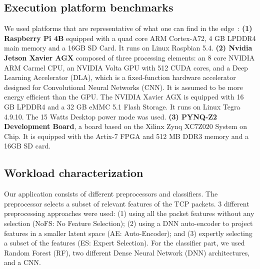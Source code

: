 \subsection{Execution platform benchmarks} \label{section:herocache-characterization-platforms}

We used platforms that are representative of what one can find in the edge~\cite{slimani:hal-04159551,kljucaric2020}: 
\textbf{(1) Raspberry Pi 4B} equipped with a quad core ARM Cortex-A72, 4 GB LPDDR4 main memory and a 16GB SD Card. It runs on Linux Raspbian 5.4.
\textbf{(2) Nvidia Jetson Xavier AGX} composed of three processing elements: an 8 core NVIDIA ARM Carmel CPU, an NVIDIA Volta GPU with 512 CUDA cores, and a Deep Learning Accelerator (DLA), which is a fixed-function hardware accelerator designed for Convolutional Neural Networks (CNN). It is assumed to be more energy efficient than the GPU. The NVIDIA Xavier AGX is equipped with 16 GB LPDDR4 and a 32 GB eMMC 5.1 Flash Storage. It runs on Linux Tegra 4.9.10. The 15 Watts Desktop power mode was used. 
\textbf{(3) PYNQ-Z2 Development Board}, a board based on the Xilinx Zynq XC7Z020 System on Chip. It is equipped with the Artix-7 FPGA and 512 MB DDR3 memory and a 16GB SD card.

\subsection{Workload characterization}
\label{section:herocache-characterization-workloads}

Our application consists of different preprocessors and classifiers. The preprocessor selects a subset of relevant features of the TCP packets. 3 different preprocessing approaches were used: (1) using all the packet features without any selection (NoFS: No Feature Selection); (2) using a DNN auto-encoder to project features in a smaller latent space (AE: Auto-Encoder); and (3) expertly selecting a subset of the features (ES: Expert Selection). For the classifier part, we used Random Forest (RF), two different Dense Neural Network (DNN) architectures, and a CNN.

